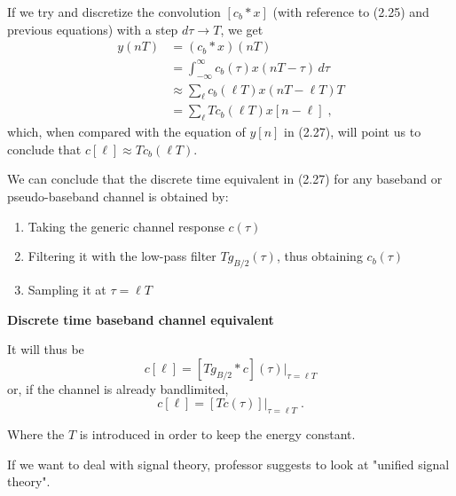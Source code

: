 \documentclass[a4paper, 12pt]{book}
\begin{document}
If we try and discretize the convolution $[c_b * x]$ (with reference to (2.25) and previous equations) with a step $d\tau \to T$, we get
\begin{align}
y(nT) &= (c_b * x)(nT) \nonumber \\
&= \int_{-\infty}^{\infty} c_b(\tau)x(nT - \tau) \, d\tau \tag{2.28} \\
&\approx \sum_{\ell} c_b(\ell T) x(nT - \ell T) T \tag{2.29} \\
&= \sum_{\ell} T c_b(\ell T) x[n-\ell] \;, \tag{2.30}
\end{align}
which, when compared with the equation of $y[n]$ in (2.27), will point us to conclude that $c[\ell] \approx T c_b(\ell T)$.

We can conclude that the discrete time equivalent in (2.27) for any baseband or pseudo-baseband channel is obtained by:

\clearpage %

\begin{enumerate}
    \item Taking the generic channel response $c(\tau)$
    \item Filtering it with the low-pass filter $T g_{B/2}(\tau)$, thus obtaining $c_b(\tau)$
    \item Sampling it at $\tau = \ell T$
\end{enumerate}

\begin{tcolorbox}[colframe=cyan!80!blue, colback=white, boxrule=1pt, arc=2pt]
    \textcolor{cyan!80!blue}{\textbf{Discrete time baseband channel equivalent}}

    It will thus be
    $$
    c[\ell] = [T g_{B/2} * c](\tau)|_{\tau = \ell T}
    $$
    or, if the channel is already bandlimited,
    \begin{equation}
    c[\ell] = [T c(\tau)]|_{\tau = \ell T} \;. \tag{2.31}
    \end{equation}
\end{tcolorbox}

\begin{tcolorbox}[sharp corners, boxrule=0pt, leftrule=2pt, colframe=green!60!black, colback=green!5, left=5pt, top=3pt, bottom=3pt]
    Where the $T$ is introduced in order to keep the energy constant.
    
    If we want to deal with signal theory, professor suggests to look at "unified signal theory".
\end{tcolorbox}
\end{document}
